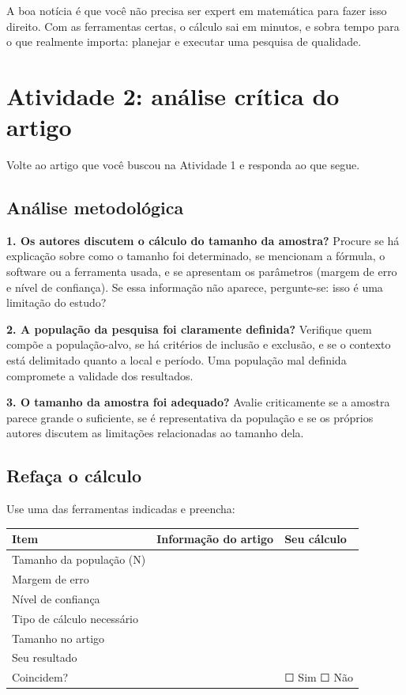 \documentclass[
]{book}
\newcounter{none} %
\begin{document}
A boa notícia é que você não precisa ser expert em matemática para fazer isso direito. Com as ferramentas certas, o cálculo sai em minutos, e sobra tempo para o que realmente importa: planejar e executar uma pesquisa de qualidade.

\section{Atividade 2: análise crítica do artigo}\label{atividade-2-anuxe1lise-cruxedtica-do-artigo}

Volte ao artigo que você buscou na Atividade 1 e responda ao que segue.

\subsection{Análise metodológica}\label{anuxe1lise-metodoluxf3gica}

\textbf{1. Os autores discutem o cálculo do tamanho da amostra?} Procure se há explicação sobre como o tamanho foi determinado, se mencionam a fórmula, o software ou a ferramenta usada, e se apresentam os parâmetros (margem de erro e nível de confiança). Se essa informação não aparece, pergunte-se: isso é uma limitação do estudo?

\textbf{2. A população da pesquisa foi claramente definida?} Verifique quem compõe a população-alvo, se há critérios de inclusão e exclusão, e se o contexto está delimitado quanto a local e período. Uma população mal definida compromete a validade dos resultados.

\textbf{3. O tamanho da amostra foi adequado?} Avalie criticamente se a amostra parece grande o suficiente, se é representativa da população e se os próprios autores discutem as limitações relacionadas ao tamanho dela.

\subsection{Refaça o cálculo}\label{refauxe7a-o-cuxe1lculo}

Use uma das ferramentas indicadas e preencha:

{\def\LTcaptype{none} %
\begin{longtable}[]{@{}lll@{}}
\toprule\noalign{}
Item & Informação do artigo & Seu cálculo \\
\midrule\noalign{}
\endhead
\bottomrule\noalign{}
\endlastfoot
Tamanho da população (N) & & \\
Margem de erro & & \\
Nível de confiança & & \\
Tipo de cálculo necessário & & \\
Tamanho no artigo & & \\
Seu resultado & & \\
Coincidem? & & ☐ Sim ☐ Não \\
\end{longtable}
}
\end{document}
